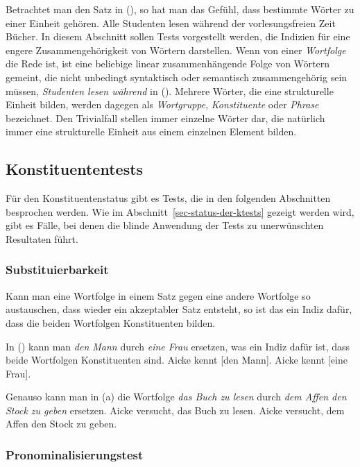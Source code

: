 Betrachtet man den Satz in (), so hat man das Gefühl, dass bestimmte Wörter zu einer
Einheit gehören.
\ea
Alle Studenten lesen während der vorlesungsfreien Zeit Bücher.
\z
In diesem Abschnitt sollen Tests vorgestellt werden, die Indizien für eine engere
Zusammengehörigkeit von Wörtern darstellen. Wenn von einer \emph{Wortfolge}
die Rede ist, ist eine beliebige linear zusammenhängende Folge von Wörtern gemeint, 
die nicht unbedingt syntaktisch oder semantisch zusammengehörig sein müssen, \zb
\emph{Studenten lesen während} in (). Mehrere Wörter, die eine strukturelle Einheit bilden,
werden dagegen als \emph{Wortgruppe}, \emph{Konstituente}
oder \emph{Phrase} bezeichnet. Den Trivialfall stellen immer einzelne Wörter dar, die
natürlich immer eine strukturelle Einheit aus einem einzelnen Element bilden.

\subsection{Konstituententests}

Für den Konstituentenstatus gibt es Tests, die in den folgenden Abschnitten besprochen werden.
Wie im Abschnitt~\ref{sec-status-der-ktests} gezeigt werden wird, gibt es Fälle, bei denen die
blinde Anwendung der Tests zu unerwünschten Resultaten führt.

\subsubsection{Substituierbarkeit}

Kann man eine Wortfolge %
in einem Satz gegen eine andere Wortfolge so austauschen, dass
wieder ein akzeptabler Satz entsteht, so ist das ein Indiz dafür, dass 
die beiden Wortfolgen Konstituenten bilden.

In () kann man \emph{den Mann} durch \emph{eine Frau} ersetzen, was ein Indiz dafür
ist, dass beide Wortfolgen Konstituenten sind.
\eal
\ex Aicke kennt [den Mann].
\ex Aicke kennt [eine Frau].
\zl

\noindent
Genauso kann man in (a) die Wortfolge \emph{das Buch zu lesen} durch
\emph{dem Affen den Stock zu geben} ersetzen.
\eal
\ex Aicke versucht, das Buch zu lesen.\label{ex-das-buch-zu-lesen}
\ex Aicke versucht, dem Affen den Stock zu geben.
\zl


\subsubsection{Pronominalisierungstest}

